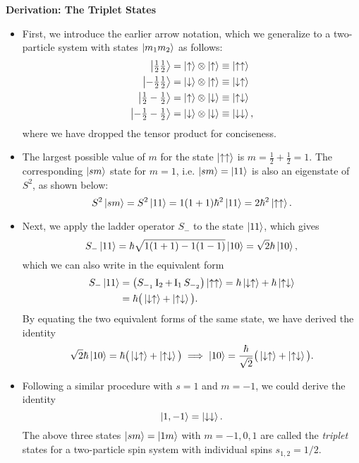 \documentclass[11pt, a4paper]{article}
\newcommand{\ua}{\uparrow}  %
\newcommand{\da}{\downarrow}  %
\newcommand{\II}{\operatorname{I}}  %
\begin{document}
\textbf{Derivation: The Triplet States}
\begin{itemize}
    \item First, we introduce the earlier arrow notation, which we generalize to a two-particle system with states $ \ket{m_{1}m_{2}}  $ as follows:
    \begin{align*}
        \ket{\tfrac{1}{2}\tfrac{1}{2}} &= \ket{\ua} \otimes \ket{\ua} \equiv \ket{\ua\ua}\\
        \ket{-\tfrac{1}{2}\tfrac{1}{2}} &= \ket{\da} \otimes \ket{\ua} \equiv \ket{\da\ua}\\
        \ket{\tfrac{1}{2}-\tfrac{1}{2}} &= \ket{\ua} \otimes \ket{\da} \equiv \ket{\ua\da}\\
        \ket{-\tfrac{1}{2}-\tfrac{1}{2}} &= \ket{\da} \otimes \ket{\da} \equiv \ket{\da\da},
    \end{align*}
    where we have dropped the tensor product for conciseness.

    \item The largest possible value of $ m $ for the state $ \ket{\ua \ua} $ is $ m = \tfrac{1}{2} + \tfrac{1}{2} = 1 $. The corresponding $ \ket{sm} $ state for $ m = 1 $, i.e. $ \ket{sm} = \ket{11} $ is also an eigenstate of $ S^{2} $, as shown below:
    \begin{equation*}
        S^{2}\ket{sm} = S^{2}\ket{11} = 1(1 + 1)\hbar^{2}\ket{11} = 2\hbar^{2}\ket{\ua\ua}.
    \end{equation*}
    
    \item Next, we apply the ladder operator $ S_{-} $ to the state $ \ket{11} $, which gives
    \begin{equation*}
        S_{-}\ket{11} = \hbar \sqrt{1(1+1) - 1(1-1)} \ket{10} = \sqrt{2}\hbar \ket{10},
    \end{equation*}
    which we can also write in the equivalent form
    \begin{align*}
        S_{-}\ket{11} & = \big( S_{-_{1}}\II_{2} + \II_{1} S_{-_{2}} \big)\ket{\ua\ua} = \hbar \ket{\da\ua} + \hbar \ket{\ua\da}\\
        &= \hbar \big( \ket{\da\ua} + \ket{\ua\da} \big).
    \end{align*}
    By equating the two equivalent forms of the same state, we have derived the identity
    \begin{equation*}
        \sqrt{2}\hbar \ket{10} = \hbar \big( \ket{\da\ua} + \ket{\ua\da} \big) \implies \ket{10} = \frac{\hbar}{\sqrt{2}} \big( \ket{\da\ua} + \ket{\ua\da} \big).
    \end{equation*}
    
    \item Following a similar procedure with $ s = 1 $ and $ m = -1 $, we could derive the identity
    \begin{equation*}
        \ket{1, -1} = \ket{\da\da}.
    \end{equation*}
    The above three states $ \ket{sm} = \ket{1m} $ with $ m = -1, 0, 1 $ are called the \textit{triplet} states for a two-particle spin system with individual spins $ s_{1,2} = 1/2 $.

\end{itemize}
\end{document}
